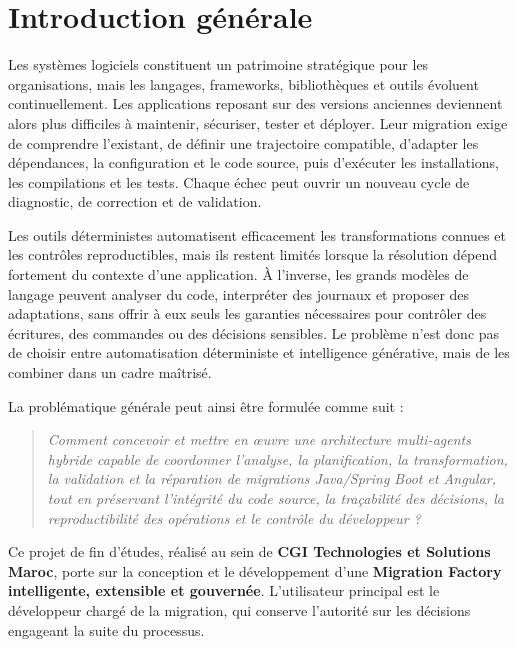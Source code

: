 \chapter*{Introduction générale}

Les systèmes logiciels constituent un patrimoine stratégique pour les organisations, mais les langages, frameworks, bibliothèques et outils évoluent continuellement. Les applications reposant sur des versions anciennes deviennent alors plus difficiles à maintenir, sécuriser, tester et déployer. Leur migration exige de comprendre l'existant, de définir une trajectoire compatible, d'adapter les dépendances, la configuration et le code source, puis d'exécuter les installations, les compilations et les tests. Chaque échec peut ouvrir un nouveau cycle de diagnostic, de correction et de validation.

Les outils déterministes automatisent efficacement les transformations connues et les contrôles reproductibles, mais ils restent limités lorsque la résolution dépend fortement du contexte d'une application. À l'inverse, les grands modèles de langage peuvent analyser du code, interpréter des journaux et proposer des adaptations, sans offrir à eux seuls les garanties nécessaires pour contrôler des écritures, des commandes ou des décisions sensibles. Le problème n'est donc pas de choisir entre automatisation déterministe et intelligence générative, mais de les combiner dans un cadre maîtrisé.

La problématique générale peut ainsi être formulée comme suit :

\begin{quote}
\itshape
Comment concevoir et mettre en œuvre une architecture multi-agents hybride capable de coordonner l'analyse, la planification, la transformation, la validation et la réparation de migrations Java/Spring Boot et Angular, tout en préservant l'intégrité du code source, la traçabilité des décisions, la reproductibilité des opérations et le contrôle du développeur ?
\end{quote}

Ce projet de fin d'études, réalisé au sein de \textbf{CGI Technologies et Solutions Maroc}, porte sur la conception et le développement d'une \textbf{Migration Factory intelligente, extensible et gouvernée}. L'utilisateur principal est le développeur chargé de la migration, qui conserve l'autorité sur les décisions engageant la suite du processus.

